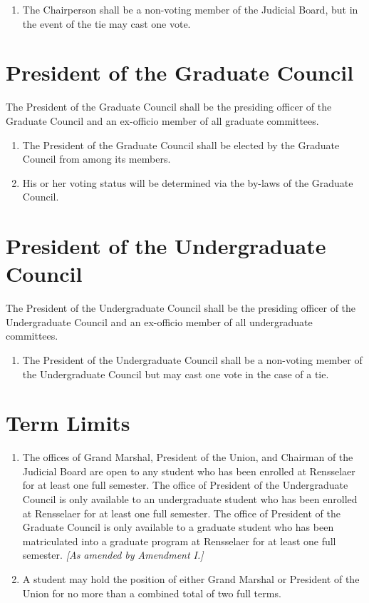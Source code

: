 \begin{enumerate}
\item The Chairperson shall be a non-voting member of the Judicial Board, but in the event of the tie may cast one vote.
\end{enumerate}

\section{President of the Graduate Council}
The President of the Graduate Council shall be the presiding officer of the Graduate Council and an ex-officio member of all graduate committees.

\begin{enumerate}
\item The President of the Graduate Council shall be elected by the Graduate Council from among its members.
\item His or her voting status will be determined via the by-laws of the Graduate Council.
\end{enumerate}

\section{President of the Undergraduate Council}
The President of the Undergraduate Council shall be the presiding officer of the Undergraduate Council and an ex-officio member of all undergraduate committees.

\begin{enumerate}
\item The President of the Undergraduate Council shall be a non-voting member of the
Undergraduate Council but may cast one vote in the case of a tie.
\end{enumerate}

\section{Term Limits}
\begin{enumerate}
\item The offices of Grand Marshal, President of the Union, and Chairman of the Judicial Board are open to any student who has been enrolled at Rensselaer for at least one full semester. The office of President of the Undergraduate Council is only available to an undergraduate student who has been enrolled at Rensselaer for at least one full semester. The office of President of the Graduate Council is only available to a graduate student who has been matriculated into a graduate program at Rensselaer for at least one full semester. \textit{[As amended by Amendment I.]}
\item A student may hold the position of either Grand Marshal or President of the Union for no more than a combined total of two full terms.
\end{enumerate}
